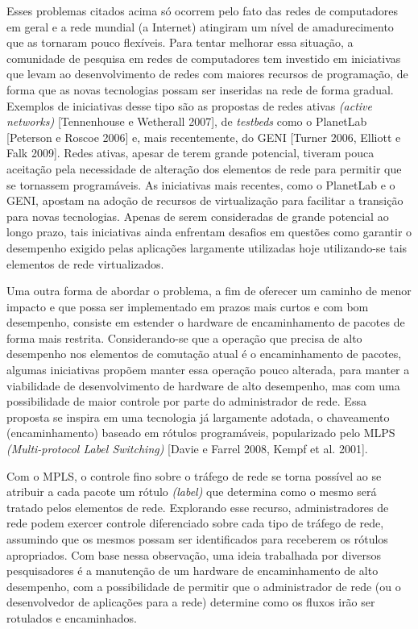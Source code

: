 Esses problemas citados acima só ocorrem pelo fato das redes
de computadores em geral e a rede mundial (a Internet)
atingiram um nível de amadurecimento que as tornaram pouco 
flexíveis.
Para tentar melhorar essa situação, a comunidade de pesquisa
em redes de computadores tem investido em iniciativas que
levam ao desenvolvimento de redes com maiores 
recursos de programação, de forma que as novas tecnologias
possam ser inseridas na rede de forma gradual. Exemplos de
iniciativas desse tipo são as propostas de redes ativas
\textit{(active networks)} [Tennenhouse e Wetherall 2007],
de \textit{testbeds} como o PlanetLab [Peterson e Roscoe 2006]
e, mais recentemente, do GENI [Turner 2006, Elliott e Falk
2009]. Redes ativas, apesar de terem grande potencial,
tiveram pouca aceitação pela necessidade de alteração dos
elementos de rede para permitir que se tornassem programáveis. As iniciativas 
mais recentes, como o PlanetLab e o GENI, apostam na adoção
de recursos de virtualização para facilitar a transição para
novas tecnologias. Apenas de serem consideradas de
grande potencial ao longo prazo, tais iniciativas ainda
enfrentam desafios em questões como garantir o desempenho
exigido pelas aplicações largamente utilizadas hoje
utilizando-se tais elementos de rede virtualizados.

Uma outra forma de abordar o problema, a fim de oferecer
um caminho de menor impacto e que possa ser implementado 
em prazos mais curtos e com bom desempenho, consiste
em estender o hardware de encaminhamento de pacotes
de forma mais restrita. Considerando-se que a operação 
que precisa de alto desempenho nos elementos de comutação
atual é o encaminhamento de pacotes, algumas iniciativas
propõem manter essa operação pouco alterada, para manter 
a viabilidade de desenvolvimento de hardware de alto
desempenho, mas com uma possibilidade de maior controle 
por parte do administrador de rede. Essa proposta se inspira 
em uma tecnologia já largamente adotada, o chaveamento
(encaminhamento) baseado em rótulos programáveis, 
popularizado pelo MLPS \textit{(Multi-protocol Label
 Switching)} [Davie e Farrel 2008, Kempf et al. 2001].

Com o MPLS, o controle fino sobre o tráfego de rede se torna 
possível ao se atribuir a cada pacote um rótulo \textit{(label)}
que determina como o mesmo será tratado pelos elementos
de rede. Explorando esse recurso, administradores de rede podem
exercer controle diferenciado sobre cada tipo de tráfego de rede,
assumindo que os mesmos possam ser identificados para
receberem os rótulos apropriados. Com base nessa observação,
uma ideia trabalhada por diversos pesquisadores é a manutenção 
de um hardware de encaminhamento de alto desempenho, com
a possibilidade de permitir que o administrador de rede (ou 
o desenvolvedor de aplicações para a rede) determine como 
os fluxos irão ser rotulados e encaminhados.

